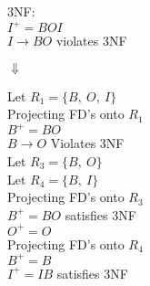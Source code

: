 \documentclass[12pt]{article}
\begin{document}
3NF:\\
$I^+ = BOI$\\
$I \rightarrow BO$ violates 3NF
\begin{center}
    $\Downarrow$
\end{center}
\begin{minipage}[t]{0.5\textwidth} %
    Let $R_1 = \{B,\ O,\ I\}$\\

    Projecting FD's onto $R_1$\\
    $B^+ = BO$ \\
    $B \rightarrow O$ Violates 3NF\\


    Let $R_3 = \{B,\ O\}$\\
    Let $R_4 = \{B,\ I\}$\\

    Projecting FD's onto $R_3$\\
    $B^+ = BO$ satisfies 3NF\\
    $O^+ = O$\\

    Projecting FD's onto $R_4$\\
    $B^+ = B$ \\
    $I^+ = IB$ satisfies 3NF\\

\end{minipage}
\end{document}
